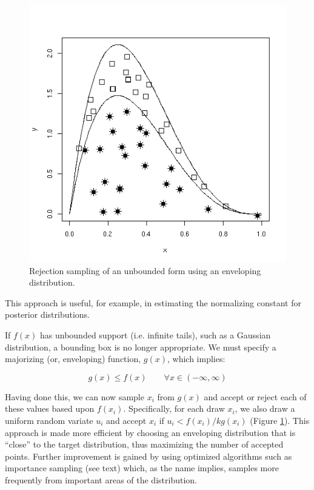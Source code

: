 \documentclass[]{book}
\begin{document}
\begin{figure}[h]
        \begin{center}
        \includegraphics[scale=0.4]{envelope.png}
    \end{center}
    \caption{Rejection sampling of an unbounded form using an enveloping distribution.}
    \label{fig:unbound}
\end{figure}

\noindent This approach is useful, for example, in estimating the normalizing constant for posterior distributions.

If $f(x)$ has unbounded support (i.e. infinite tails), such as a Gaussian distribution, a bounding box is no longer appropriate. We must specify a majorizing (or, enveloping) function, $g(x)$, which implies:

\[
g(x) \le  f(x) \qquad\forall x \in (-\infty,\infty)
\]

Having done this, we can now sample ${x_i}$ from $g(x)$ and accept or reject each of these values based upon $f(x_i)$. Specifically, for each draw $x_i$, we also draw a uniform random variate $u_i$ and accept $x_i$ if $u_i < f(x_i)/kg(x_i)$ (Figure \ref{fig:unbound}). This approach is made more efficient by choosing an enveloping distribution that is ``close'' to the target distribution, thus maximizing the number of accepted points. Further improvement is gained by using optimized algorithms such as importance sampling (see text) which, as the name implies, samples more frequently from important areas of the distribution.
\end{document}

